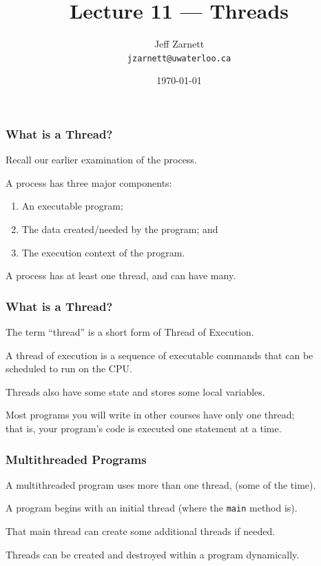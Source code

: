 

\title{Lecture 11 --- Threads}

\author{Jeff Zarnett \\ \small \texttt{jzarnett@uwaterloo.ca}}
\date{\today}




\begin{frame}
  \titlepage

 \end{frame}

\begin{frame}
\frametitle{What is a Thread?}


Recall our earlier examination of the process. 

A process has three major components: 
\begin{enumerate}
\item An executable program;
\item The data created/needed by the program; and 
\item The execution context of the program.
\end{enumerate}

A process has at least one \alert{thread}, and can have many.

\end{frame}

\begin{frame}
\frametitle{What is a Thread?}

The term ``thread'' is a short form of \alert{Thread of Execution}.

  A thread of execution is a sequence of executable commands that can be scheduled to run on the CPU. 
  
  Threads also have some state and stores some local variables.
  
  Most programs you will write in other courses have only one thread;\\
  \quad that is, your program's code is executed one statement at a time.

\end{frame}

\begin{frame}
\frametitle{Multithreaded Programs}

A multithreaded program uses more than one thread, (some of the time).

  A program begins with an initial thread (where the \texttt{main} method is).
  
That main thread can create some additional threads if needed.

 Threads can be created and destroyed within a program dynamically.

\end{frame}

